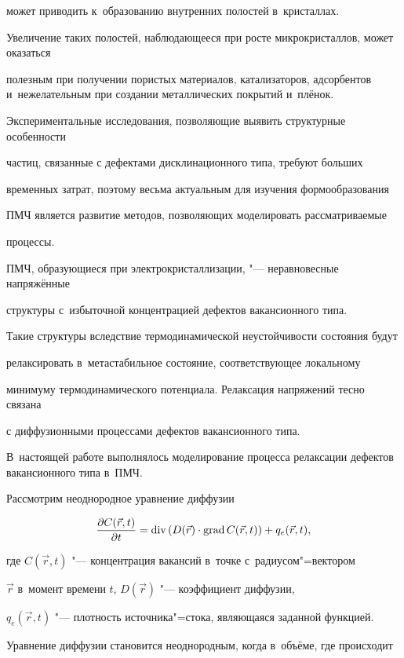 может приводить к~образованию внутренних полостей в~кристаллах.

Увеличение таких полостей, наблюдающееся при росте микрокристаллов, может оказаться

полезным при получении пористых материалов, катализаторов, адсорбентов и~нежелательным при создании металлических покрытий и~плёнок.

Экспериментальные исследования, позволяющие выявить структурные особенности

частиц, связанные с дефектами дисклинационного типа, требуют больших

временных затрат, поэтому весьма актуальным для изучения формообразования

ПМЧ является развитие методов, позволяющих моделировать рассматриваемые

процессы.



ПМЧ,  образующиеся при электрокристаллизации,  "--- неравновесные напряжённые

структуры с~избыточной концентрацией дефектов вакансионного типа.

Такие структуры вследствие термодинамической неустойчивости состояния будут

релаксировать в~метастабильное состояние,  соответствующее локальному

минимуму термодинамического потенциала. Релаксация напряжений тесно связана

с диффузионными процессами дефектов вакансионного типа.

В~настоящей работе выполнялось моделирование процесса релаксации дефектов вакансионного типа в~ПМЧ.

Рассмотрим неоднородное уравнение диффузии

\[

\frac{\partial C(\vec {r},  t)}{\partial t}={\rm div}\left( {D(\vec {r})\cdot

{\rm grad}\, C(\vec {r}, t)} \right)+q_e (\vec {r}, t),

\]

где $C(\vec {r}, t) $ "---  концентрация вакансий в~точке с~радиусом"=вектором

$\vec{r}$ в~момент времени $t$,  $D(\vec {r})$ "--- коэффициент диффузии,

$q_e (\vec {r}, t)$ "--- плотность источника"=стока,  являющаяся заданной функцией.

Уравнение диффузии становится неоднородным,  когда в~объёме,  где происходит

